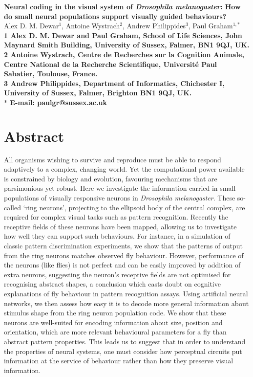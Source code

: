 \documentclass[10pt]{article}
\date{}
\begin{document}
\begin{flushleft}
{\Large
\textbf{Neural coding in the visual system of \emph{Drosophila melanogaster}: How do small neural populations support visually guided behaviours?}
}
\\
Alex D. M. Dewar$^{1}$,
Antoine Wystrach$^{2}$,
Andrew Philippides$^{3}$,
Paul Graham$^{1,\ast}$
\\
\bf{1} Alex D. M. Dewar and Paul Graham, School of Life Sciences, John Maynard Smith Building, University of Sussex, Falmer, BN1 9QJ, UK.
\\
\bf{2} Antoine Wystrach, Centre de Recherches sur la Cognition Animale, Centre National de la Recherche Scientifique, Université Paul Sabatier, Toulouse, France.
\\
\bf{3} Andrew Philippides, Department of Informatics, Chichester I, University of Sussex, Falmer, Brighton BN1 9QJ, UK.
\\
$\ast$ E-mail: paulgr@sussex.ac.uk
\end{flushleft}

\section*{Abstract}
All organisms wishing to survive and reproduce must be able to respond adaptively to a complex, changing world. Yet the computational power available is constrained by biology and evolution, favouring mechanisms that are parsimonious yet robust. Here we investigate the information carried in small populations of visually responsive neurons in \emph{Drosophila melanogaster}. These so-called `ring neurons', projecting to the ellipsoid body of the central complex, are required for complex visual tasks such as pattern recognition. Recently the receptive fields of these neurons have been mapped, allowing us to investigate how well they can support such behaviours. For instance, in a simulation of classic pattern discrimination experiments, we show that the patterns of output from the ring neurons matches observed fly behaviour. However, performance of the neurons (like flies) is not perfect and can be easily improved by addition of extra neurons, suggesting the neuron's receptive fields are not optimised for recognising abstract shapes, a conclusion which casts doubt on cognitive explanations of fly behaviour in pattern recognition assays. Using artificial neural networks, we then assess how easy it is to decode more general information about stimulus shape from the ring neuron population code. We show that these neurons are well-suited for encoding information about size, position and orientation, which are more relevant behavioural parameters for a fly than abstract pattern properties. This leads us to suggest that in order to understand the properties of neural systems, one must consider how perceptual circuits put information at the service of behaviour rather than how they preserve visual information.
\end{document}
